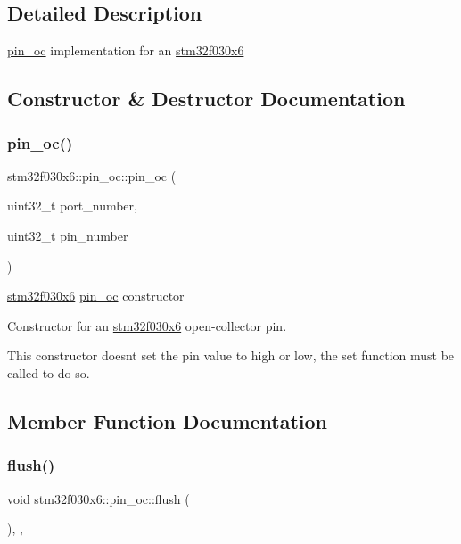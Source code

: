 \subsection{Detailed Description}
\hyperlink{classstm32f030x6_1_1pin__oc}{pin\+\_\+oc} implementation for an \hyperlink{namespacestm32f030x6}{stm32f030x6} 

\subsection{Constructor \& Destructor Documentation}
\mbox{\label{classstm32f030x6_1_1pin__oc_ad0c22cf306b23e62917d6610131ae5f7}} 
\subsubsection{\texorpdfstring{pin\+\_\+oc()}{pin\_oc()}}
{\footnotesize\ttfamily stm32f030x6\+::pin\+\_\+oc\+::pin\+\_\+oc (\begin{DoxyParamCaption}\item[{uint32\+\_\+t}]{port\+\_\+number,  }\item[{uint32\+\_\+t}]{pin\+\_\+number }\end{DoxyParamCaption})\hspace{0.3cm}{\ttfamily [inline]}}

\hyperlink{namespacestm32f030x6}{stm32f030x6} \hyperlink{classstm32f030x6_1_1pin__oc}{pin\+\_\+oc} constructor

Constructor for an \hyperlink{namespacestm32f030x6}{stm32f030x6} open-\/collector pin.

This constructor doesn\textquotesingle{}t set the pin value to high or low, the set function must be called to do so. 

\subsection{Member Function Documentation}
\mbox{\label{classstm32f030x6_1_1pin__oc_afa293f1a0ee8f1cb4936521df144453e}} 
\subsubsection{\texorpdfstring{flush()}{flush()}}
{\footnotesize\ttfamily void stm32f030x6\+::pin\+\_\+oc\+::flush (\begin{DoxyParamCaption}{ }\end{DoxyParamCaption})\hspace{0.3cm}{\ttfamily [inline]}, {\ttfamily [override]}, {\ttfamily [virtual]}}





